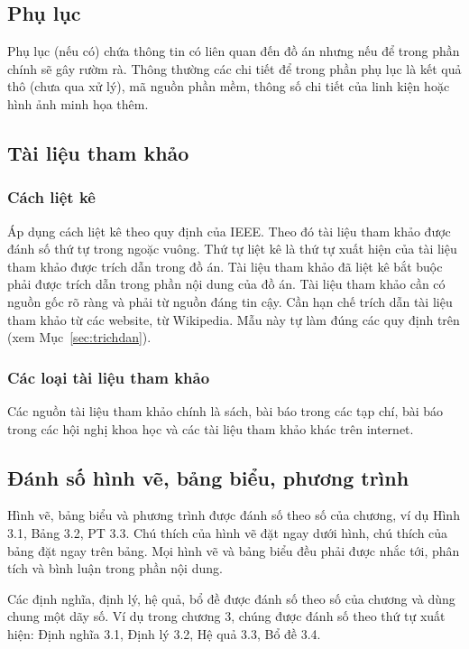 \subsection{Phụ lục}
Phụ lục (nếu có) chứa thông tin có liên quan đến đồ án nhưng nếu để trong phần chính sẽ gây rườm rà. Thông thường các chi tiết để trong phần phụ lục là kết quả thô (chưa qua xử lý), mã nguồn phần mềm, thông số chi tiết của linh kiện hoặc hình ảnh minh họa thêm.

\subsection{Tài liệu tham khảo}
\subsubsection{Cách liệt kê}
Áp dụng cách liệt kê theo quy định của IEEE. Theo đó tài liệu tham khảo được đánh số thứ tự trong ngoặc vuông. Thứ tự liệt kê là thứ tự xuất hiện của tài liệu tham khảo được trích dẫn trong đồ án. Tài liệu tham khảo đã liệt kê bắt buộc phải được trích dẫn trong phần nội dung của đồ án. Tài liệu tham khảo cần có nguồn gốc rõ ràng và phải từ nguồn đáng tin cậy. Cần hạn chế trích dẫn tài liệu tham khảo từ các website, từ Wikipedia. Mẫu này tự làm đúng các quy định trên (xem Mục~\ref{sec:trichdan}).

\subsubsection{Các loại tài liệu tham khảo}
Các nguồn tài liệu tham khảo chính là sách, bài báo trong các tạp chí, bài báo trong các hội nghị khoa học và các tài liệu tham khảo khác trên internet.

\subsection{Đánh số hình vẽ, bảng biểu, phương trình}
Hình vẽ, bảng biểu và phương trình được đánh số theo số của chương, ví dụ Hình 3.1, Bảng 3.2, PT 3.3. Chú thích của hình vẽ đặt ngay dưới hình, chú thích của bảng đặt ngay trên bảng. Mọi hình vẽ và bảng biểu đều phải được nhắc tới, phân tích và bình luận trong phần nội dung.

Các định nghĩa, định lý, hệ quả, bổ đề được đánh số theo số của chương và dùng chung một dãy số. Ví dụ trong chương 3, chúng được đánh số theo thứ tự xuất hiện: Định nghĩa 3.1, Định lý 3.2, Hệ quả 3.3, Bổ đề 3.4.

\clearpage
